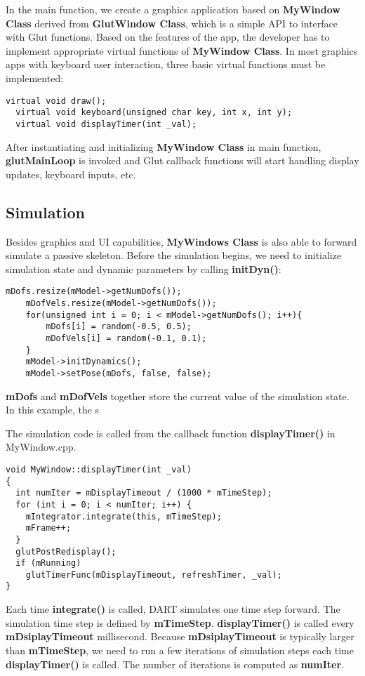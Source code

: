 In the main function, we create a graphics application based on
\textbf{MyWindow Class} derived from \textbf{GlutWindow Class}, which
is a simple API to interface with Glut functions. Based on the
features of the app, the developer has to implement appropriate
virtual functions of \textbf{MyWindow Class}. In most graphics apps
with keyboard user interaction, three basic virtual functions must be
implemented:

\ttfamily
\begin{lstlisting}[caption=MyWindow.h]
  virtual void draw();
  virtual void keyboard(unsigned char key, int x, int y);
  virtual void displayTimer(int _val);
\end{lstlisting}
\rmfamily 

After instantiating and initializing \textbf{MyWindow Class} in main
function, \textbf{glutMainLoop} is invoked and Glut callback functions
will start handling display updates, keyboard inputs, etc.

\subsection{Simulation}
Besides graphics and UI capabilities, \textbf{MyWindows Class} is also
able to forward simulate a passive skeleton. Before the simulation
begins, we need to initialize simulation state and dynamic parameters
by calling \textbf{initDyn()}:

\ttfamily
\begin{lstlisting}[caption=MyWindow.cpp]
    mDofs.resize(mModel->getNumDofs());
    mDofVels.resize(mModel->getNumDofs());
    for(unsigned int i = 0; i < mModel->getNumDofs(); i++){
        mDofs[i] = random(-0.5, 0.5);
        mDofVels[i] = random(-0.1, 0.1);
    }
    mModel->initDynamics();
    mModel->setPose(mDofs, false, false);
\end{lstlisting}
\rmfamily 

\textbf{mDofs} and \textbf{mDofVels} together store the current value
of the simulation state. In this example, the s


The simulation code is called from the callback function
\textbf{displayTimer()} in MyWindow.cpp.

\ttfamily
\begin{lstlisting}[caption=MyWindows.cpp]
void MyWindow::displayTimer(int _val)
{
  int numIter = mDisplayTimeout / (1000 * mTimeStep);
  for (int i = 0; i < numIter; i++) {
    mIntegrator.integrate(this, mTimeStep);
    mFrame++;
  }
  glutPostRedisplay();
  if (mRunning)	
    glutTimerFunc(mDisplayTimeout, refreshTimer, _val);
}
\end{lstlisting}
\rmfamily 
Each time \textbf{integrate()} is called, DART simulates one
time step forward. The simulation time step is defined by
\textbf{mTimeStep}. \textbf{displayTimer()} is called every
\textbf{mDsiplayTimeout} millisecond. Because \textbf{mDsiplayTimeout}
is typically larger than \textbf{mTimeStep}, we need to run a few
iterations of simulation steps each time \textbf{displayTimer()} is
called. The number of iterations is computed as \textbf{numIter}.

